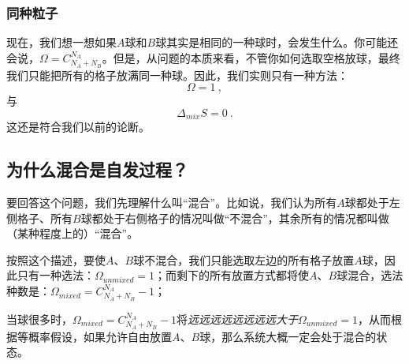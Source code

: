\subsubsection{同种粒子}
现在，我们想一想如果$A$球和$B$球其实是相同的一种球时，会发生什么。你可能还会说，$\Omega = C^{N_A}_{N_A+N_B}$。但是，从问题的本质来看，不管你如何选取空格放球，最终我们只能把所有的格子放满同一种球。因此，我们实则只有一种方法：
\begin{equation}
\Omega = 1~,
\end{equation}
与
\begin{equation}
\Delta_{mix} S = 0~.
\end{equation}
这还是符合我们以前的论断。

\subsection{为什么混合是自发过程？}
要回答这个问题，我们先理解什么叫“混合”。比如说，我们认为所有$A$球都处于左侧格子、所有$B$球都处于右侧格子的情况叫做“不混合”，其余所有的情况都叫做（某种程度上的）“混合”。

按照这个描述，要使$A$、$B$球不混合，我们只能选取左边的所有格子放置$A$球，因此只有一种选法：$\Omega_{unmixed} = 1$；而剩下的所有放置方式都将使$A$、$B$球混合，选法种数是：$\Omega_{mixed} =  C^{N_A}_{N_A+N_B} - 1$；

当球很多时，$\Omega_{mixed} = C^{N_A}_{N_A+N_B} - 1$将\textsl{远远远远远远远远大于}$\Omega_{unmixed} = 1$，从而根据等概率假设，如果允许自由放置$A$、$B$球，那么系统大概一定会处于混合的状态。
